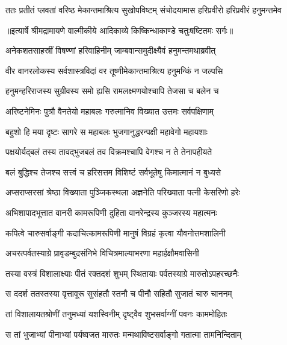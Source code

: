 \fourlineindentedshloka
{ततः प्रतीतं प्लवतां वरिष्ठ}
{मेकान्तमाश्रित्य सुखोपविष्टम्}
{संचोदयामास हरिप्रवीरो}
{ हरिप्रवीरं हनुमन्तमेव} %


{॥इत्यार्षे श्रीमद्रामायणे वाल्मीकीये आदिकाव्ये किष्किन्धाकाण्डे चतुःषष्टितमः सर्गः॥}


\twolineshloka
{अनेकशतसाहस्रीं विषण्णां हरिवाहिनीम्}
{जाम्बवान्समुदीक्ष्यैवं हनुमन्तमथाब्रवीत्} %

\twolineshloka
{वीर वानरलोकस्य सर्वशास्त्रविदां वर}
{तूष्णीमेकान्तमाश्रित्य हनुमन्किं न जल्पसि} %

\twolineshloka
{हनुमन्हरिराजस्य सुग्रीवस्य समो ह्यसि}
{रामलक्ष्मणयोश्चापि तेजसा च बलेन च} %

\twolineshloka
{अरिष्टनेमिनः पुत्रौ वैनतेयो महाबलः}
{गरुत्मानिव विख्यात उत्तमः सर्वपक्षिणाम्} %

\twolineshloka
{बहुशो हि मया दृष्टः सागरे स महाबलः}
{भुजगानुद्धरन्पक्षी महावेगो महायशाः} %

\twolineshloka
{पक्षयोर्यद्बलं तस्य तावद्भुजबलं तव}
{विक्रमश्चापि वेगश्च न ते तेनापहीयते} %

\twolineshloka
{बलं बुद्धिश्च तेजश्च सत्त्वं च हरिसत्तम}
{विशिष्टं सर्वभूतेषु किमात्मानं न बुध्यसे} %

\twolineshloka
{अप्सराप्सरसां श्रेष्ठा विख्याता पुञ्जिकस्थला}
{अज्ञनेति परिख्याता पत्नी केसरिणो हरेः} %

\twolineshloka
{अभिशापादभूत्तात वानरी कामरूपिणी}
{दुहिता वानरेन्द्रस्य कुञ्जरस्य महात्मनः} %

\twolineshloka
{कपित्वे चारुसर्वाङ्गी कदाचित्कामरूपिणी}
{मानुषं विग्रहं कृत्वा यौवनोत्तमशालिनी} %

\twolineshloka
{अचरत्पर्वतस्याग्रे प्रावृडम्बुदसंनिभे}
{विचित्रमाल्याभरणा महार्हक्षौमवासिनी} %

\twolineshloka
{तस्या वस्त्रं विशालाक्ष्याः पीतं रक्तदशं शुभम्}
{स्थितायाः पर्वतस्याग्रे मारुतोऽपहरच्छनैः} %

\twolineshloka
{स ददर्श ततस्तस्या वृत्तावूरू सुसंहतौ}
{स्तनौ च पीनौ सहितौ सुजातं चारु चाननम्} %

\twolineshloka
{तां विशालायतश्रोणीं तनुमध्यां यशस्विनीम्}
{दृष्ट्वैव शुभसर्वाग्नीं पवनः काममोहितः} %

\twolineshloka
{स तां भुजाभ्यां पीनाभ्यां पर्यष्वजत मारुतः}
{मन्मथाविष्टसर्वाङ्गो गतात्मा तामनिन्दिताम्} %

